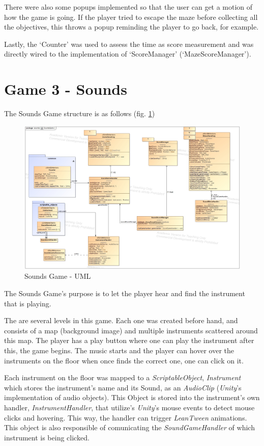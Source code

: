 There were also some popups implemented so that the user can get a motion of how the game is going. If the player tried to escape the maze before collecting all the objectives, this throws a popup reminding the player to go back, for example.

Lastly, the `Counter' was used to assess the time as score measurement and was directly wired to the implementation of `ScoreManager' (`MazeScoreManager').

\newpage
\section{Game 3 - Sounds}

The Sounds Game structure is as follows (fig. \ref*{fig:soundsGameArq})

\begin{figure}[!h]
    \centering
    \includegraphics[width=\linewidth]{Chapters/new_architechture/class__sounds__SoundsGame.jpg}
    \caption{Sounds Game - UML}
    \label{fig:soundsGameArq}
\end{figure}

The Sounds Game's purpose is to let the player hear and find the instrument that is playing.

The are several levels in this game. Each one was created before hand, and consists of a map (background image) and multiple instruments scattered around this map. The player has a play button where one can play the instrument after this, the game begins. The music starts and the player can hover over the instruments on the floor when once finds the correct one, one can click on it.

Each instrument on the floor was mapped to a \textit{ScriptableObject}, \textit{Instrument} which stores the instrument's name and its Sound, as an \textit{AudioClip} (\textit{Unity}'s implementation of audio objects). This Object is stored into the instrument's own handler, \textit{InstrumentHandler}, that utilize's \textit{Unity}'s mouse events to detect mouse clicks and hovering. This way, the handler can trigger \textit{LeanTween} animations. This object is also responsible of comunicating the \textit{SoundGameHandler} of which instrument is being clicked.

